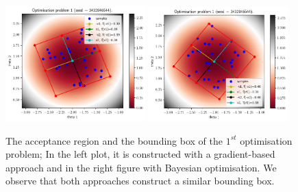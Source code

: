 \begin{figure}[h]
    \begin{center}
      \includegraphics[width=0.48\textwidth]{./Thesis/images/chapter4/ex2D_region_1.png}
      \includegraphics[width=0.48\textwidth]{./Thesis/images/chapter4/ex2D_region_1_bo.png}
    \end{center}
    \caption{The acceptance region and the bounding box of the
      $1^{st}$ optimisation problem; In the left plot, it is
      constructed with a gradient-based approach and in the right
      figure with Bayesian optimisation. We observe that both
      approaches construct a similar bounding box.}
  \label{fig:ex2_2}
\end{figure}


